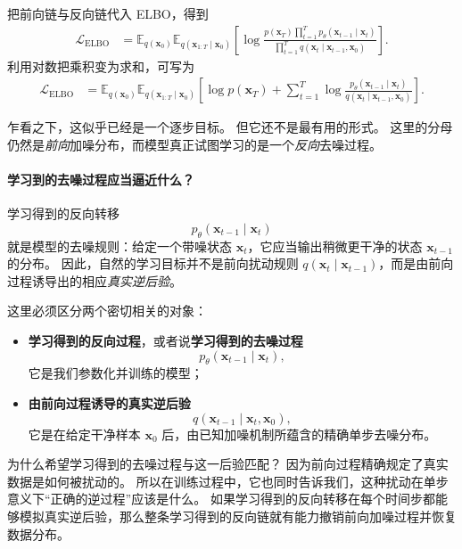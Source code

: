 把前向链与反向链代入 ELBO，得到
\[
\begin{aligned}
\mathcal{L}_{\mathrm{ELBO}}
&=
\mathbb{E}_{q(\mathbf{x}_0)}
\mathbb{E}_{q(\mathbf{x}_{1:T}\mid \mathbf{x}_0)}
\!\left[
\log
\frac{
p(\mathbf{x}_T)\prod_{t=1}^{T} p_\theta(\mathbf{x}_{t-1}\mid \mathbf{x}_t)
}{
\prod_{t=1}^{T} q(\mathbf{x}_t\mid \mathbf{x}_{t-1},\mathbf{x}_0)
}
\right].
\end{aligned}
\]
利用对数把乘积变为求和，可写为
\[
\begin{aligned}
\mathcal{L}_{\mathrm{ELBO}}
&=
\mathbb{E}_{q(\mathbf{x}_0)}
\mathbb{E}_{q(\mathbf{x}_{1:T}\mid \mathbf{x}_0)}
\!\left[
\log p(\mathbf{x}_T)
+
\sum_{t=1}^{T}
\log
\frac{
p_\theta(\mathbf{x}_{t-1}\mid \mathbf{x}_t)
}{
q(\mathbf{x}_t\mid \mathbf{x}_{t-1},\mathbf{x}_0)
}
\right].
\end{aligned}
\]

乍看之下，这似乎已经是一个逐步目标。
但它还不是最有用的形式。
这里的分母仍然是\emph{前向}加噪分布，而模型真正试图学习的是一个\emph{反向}去噪过程。

\paragraph{学习到的去噪过程应当逼近什么？}

学习得到的反向转移
\[
p_\theta(\mathbf{x}_{t-1}\mid \mathbf{x}_t)
\]
就是模型的去噪规则：给定一个带噪状态 $\mathbf{x}_t$，它应当输出稍微更干净的状态 $\mathbf{x}_{t-1}$ 的分布。
因此，自然的学习目标并不是前向扰动规则
$q(\mathbf{x}_t\mid \mathbf{x}_{t-1})$，而是由前向过程诱导出的相应\emph{真实逆后验}。

这里必须区分两个密切相关的对象：

\begin{itemize}
    \item \textbf{学习得到的反向过程}，或者说\textbf{学习得到的去噪过程}
    \[
    p_\theta(\mathbf{x}_{t-1}\mid \mathbf{x}_t),
    \]
    它是我们参数化并训练的模型；

    \item \textbf{由前向过程诱导的真实逆后验}
    \[
    q(\mathbf{x}_{t-1}\mid \mathbf{x}_t,\mathbf{x}_0),
    \]
    它是在给定干净样本 $\mathbf{x}_0$ 后，由已知加噪机制所蕴含的精确单步去噪分布。
\end{itemize}

为什么希望学习得到的去噪过程与这一后验匹配？
因为前向过程精确规定了真实数据是如何被扰动的。
所以在训练过程中，它也同时告诉我们，这种扰动在单步意义下“正确的逆过程”应该是什么。
如果学习得到的反向转移在每个时间步都能够模拟真实逆后验，那么整条学习得到的反向链就有能力撤销前向加噪过程并恢复数据分布。

